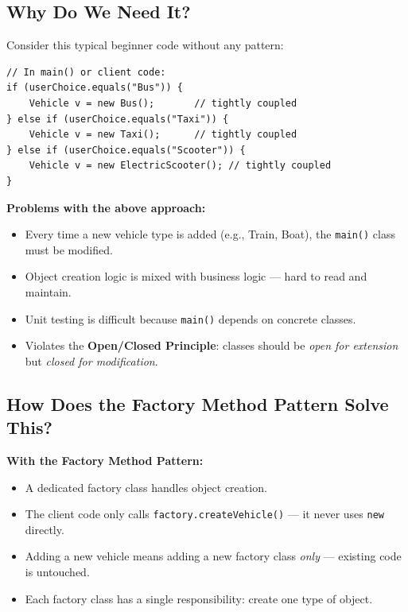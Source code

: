 \documentclass[12pt, a4paper]{article}
\begin{document}
\subsection{Why Do We Need It?}

Consider this typical beginner code without any pattern:

\begin{lstlisting}[caption={Direct object creation --- tightly coupled code}]
// In main() or client code:
if (userChoice.equals("Bus")) {
    Vehicle v = new Bus();       // tightly coupled
} else if (userChoice.equals("Taxi")) {
    Vehicle v = new Taxi();      // tightly coupled
} else if (userChoice.equals("Scooter")) {
    Vehicle v = new ElectricScooter(); // tightly coupled
}
\end{lstlisting}

\vspace{4pt}

\begin{warningbox}
\textbf{Problems with the above approach:}
\begin{itemize}[noitemsep]
    \item Every time a new vehicle type is added (e.g., Train, Boat), the \texttt{main()} class must be modified.
    \item Object creation logic is mixed with business logic --- hard to read and maintain.
    \item Unit testing is difficult because \texttt{main()} depends on concrete classes.
    \item Violates the \textbf{Open/Closed Principle}: classes should be \textit{open for extension} but \textit{closed for modification}.
\end{itemize}
\end{warningbox}

\subsection{How Does the Factory Method Pattern Solve This?}

\begin{successboxenv}
\textbf{With the Factory Method Pattern:}
\begin{itemize}[noitemsep]
    \item A dedicated factory class handles object creation.
    \item The client code only calls \texttt{factory.createVehicle()} --- it never uses \texttt{new} directly.
    \item Adding a new vehicle means adding a new factory class \textit{only} --- existing code is untouched.
    \item Each factory class has a single responsibility: create one type of object.
\end{itemize}
\end{successboxenv}
\end{document}
